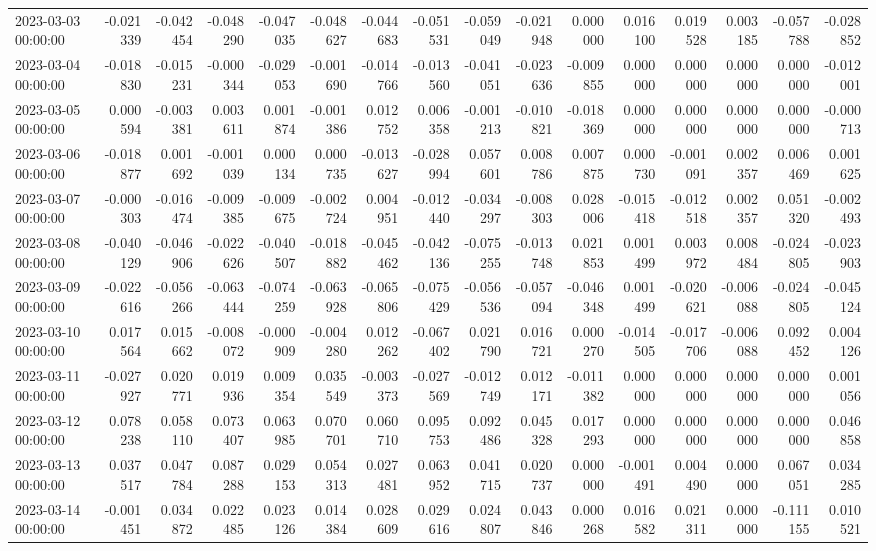 \begin{tabular}{lrrrrrrrrrrrrrrr}
2023-03-03 00:00:00 & -0.021339 & -0.042454 & -0.048290 & -0.047035 & -0.048627 & -0.044683 & -0.051531 & -0.059049 & -0.021948 & 0.000000 & 0.016100 & 0.019528 & 0.003185 & -0.057788 & -0.028852 \\
2023-03-04 00:00:00 & -0.018830 & -0.015231 & -0.000344 & -0.029053 & -0.001690 & -0.014766 & -0.013560 & -0.041051 & -0.023636 & -0.009855 & 0.000000 & 0.000000 & 0.000000 & 0.000000 & -0.012001 \\
2023-03-05 00:00:00 & 0.000594 & -0.003381 & 0.003611 & 0.001874 & -0.001386 & 0.012752 & 0.006358 & -0.001213 & -0.010821 & -0.018369 & 0.000000 & 0.000000 & 0.000000 & 0.000000 & -0.000713 \\
2023-03-06 00:00:00 & -0.018877 & 0.001692 & -0.001039 & 0.000134 & 0.000735 & -0.013627 & -0.028994 & 0.057601 & 0.008786 & 0.007875 & 0.000730 & -0.001091 & 0.002357 & 0.006469 & 0.001625 \\
2023-03-07 00:00:00 & -0.000303 & -0.016474 & -0.009385 & -0.009675 & -0.002724 & 0.004951 & -0.012440 & -0.034297 & -0.008303 & 0.028006 & -0.015418 & -0.012518 & 0.002357 & 0.051320 & -0.002493 \\
2023-03-08 00:00:00 & -0.040129 & -0.046906 & -0.022626 & -0.040507 & -0.018882 & -0.045462 & -0.042136 & -0.075255 & -0.013748 & 0.021853 & 0.001499 & 0.003972 & 0.008484 & -0.024805 & -0.023903 \\
2023-03-09 00:00:00 & -0.022616 & -0.056266 & -0.063444 & -0.074259 & -0.063928 & -0.065806 & -0.075429 & -0.056536 & -0.057094 & -0.046348 & 0.001499 & -0.020621 & -0.006088 & -0.024805 & -0.045124 \\
2023-03-10 00:00:00 & 0.017564 & 0.015662 & -0.008072 & -0.000909 & -0.004280 & 0.012262 & -0.067402 & 0.021790 & 0.016721 & 0.000270 & -0.014505 & -0.017706 & -0.006088 & 0.092452 & 0.004126 \\
2023-03-11 00:00:00 & -0.027927 & 0.020771 & 0.019936 & 0.009354 & 0.035549 & -0.003373 & -0.027569 & -0.012749 & 0.012171 & -0.011382 & 0.000000 & 0.000000 & 0.000000 & 0.000000 & 0.001056 \\
2023-03-12 00:00:00 & 0.078238 & 0.058110 & 0.073407 & 0.063985 & 0.070701 & 0.060710 & 0.095753 & 0.092486 & 0.045328 & 0.017293 & 0.000000 & 0.000000 & 0.000000 & 0.000000 & 0.046858 \\
2023-03-13 00:00:00 & 0.037517 & 0.047784 & 0.087288 & 0.029153 & 0.054313 & 0.027481 & 0.063952 & 0.041715 & 0.020737 & 0.000000 & -0.001491 & 0.004490 & 0.000000 & 0.067051 & 0.034285 \\
2023-03-14 00:00:00 & -0.001451 & 0.034872 & 0.022485 & 0.023126 & 0.014384 & 0.028609 & 0.029616 & 0.024807 & 0.043846 & 0.000268 & 0.016582 & 0.021311 & 0.000000 & -0.111155 & 0.010521 \\

\end{tabular}
